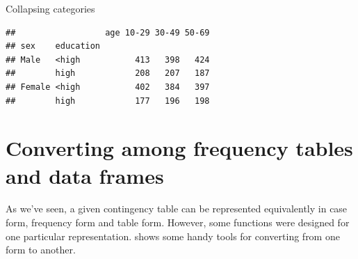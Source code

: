 \documentclass[11pt]{book}
\renewenvironment{knitrout}{\small\renewcommand{\baselinestretch}{.85}}{} %
\begin{document}
\begin{Example}{Collapsing categories}
\begin{knitrout}
\color{fgcolor}\begin{kframe}
\begin{alltt}
 \hlkwb{<-} 
         \hlstd{=}\hlstd{(}\hlstd{,} \hlstd{,}  \hlstd{,} \hlstd{,} \hlstd{,} \hlstd{),}
         \hlstd{=}\hlstd{(}\hlstd{,} \hlstd{,} \hlstd{))}
\end{alltt}
\begin{verbatim}
##                  age 10-29 30-49 50-69
## sex    education                      
## Male   <high           413   398   424
##        high            208   207   187
## Female <high           402   384   397
##        high            177   196   198
\end{verbatim}
\end{kframe}
\end{knitrout}
\end{Example}

\section{Converting among frequency tables and data frames}\label{sec:convert}

As we've seen, a given contingency table can be represented 
equivalently in case form, frequency form and table form.
However, some \R functions were designed for one particular representation.
 shows some handy tools for converting from one form to another.
\end{document}
